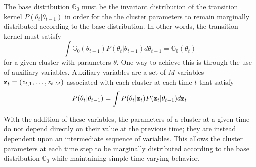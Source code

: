 \documentclass[twocolumn, final]{svjour3}
\begin{document}
The base distribution $\mathbb{G}_{0}$ must be the invariant distribution of the transition kernel $P(\theta_{t} | \theta_{t-1})$ in order for the the cluster parameters to remain marginally distributed according to the base distribution. In other words, the transition kernel must satisfy
\begin{equation}
\int \mathbb{G}_{0}(\theta_{t-1})P(\theta_{t} | \theta_{t-1}) d\theta_{t-1} = \mathbb{G}_{0}(\theta_{t})
\end{equation}
for a given cluster with parameters $\theta$. One way to achieve this is through the use of auxiliary variables. Auxiliary variables are a set of $M$ variables $\bold{z}_{t} = (z_{t,1}, \ldots, z_{t,M})$ associated with each cluster at each time $t$ that satisfy
\begin{eqnarray}
\label{auxiliaryvariablecriteria}
P(\theta_{t} | \theta_{t-1}) = \int P(\theta_{t} | \bold{z}_{t}) P(\bold{z}_{t} | \theta_{t-1}) d \bold{z}_{t}
\end{eqnarray}

With the addition of these variables, the parameters of a cluster at a given time do not depend directly on their value at the previous time; they are instead dependent upon an intermediate sequence of variables. This allows the cluster parameters at each time step to be marginally distributed according to the base distribution $\mathbb{G}_{0}$ while maintaining simple time varying behavior.
\end{document}
